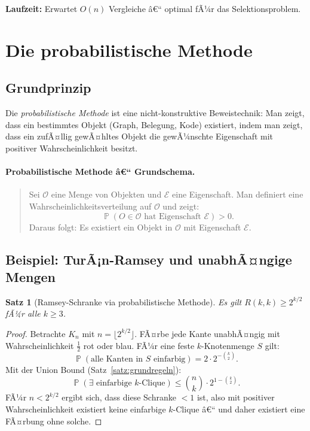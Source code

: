 ﻿\documentclass[12pt,a4paper]{article}
\theoremstyle{definition}
\theoremstyle{plain}
\newtheorem{satz}{Satz}[section]
\theoremstyle{remark}
\DeclareMathOperator{\Prob}{\mathbb{P}}
\begin{document}
\textbf{Laufzeit:} Erwartet $O(n)$ Vergleiche â€“ optimal fÃ¼r das Selektionsproblem.

\section{Die probabilistische Methode}
\label{sec:probmethode}

\subsection{Grundprinzip}

Die \emph{probabilistische Methode} \cite{alon2016probabilistic} ist eine
nicht-konstruktive Beweistechnik: Man zeigt, dass ein bestimmtes Objekt
(Graph, Belegung, Kode) existiert, indem man zeigt, dass ein zufÃ¤llig
gewÃ¤hltes Objekt die gewÃ¼nschte Eigenschaft mit positiver Wahrscheinlichkeit
besitzt.

\paragraph*{Probabilistische Methode â€“ Grundschema.}
\begin{quote}
  Sei $\mathcal{O}$ eine Menge von Objekten und $\mathcal{E}$ eine Eigenschaft.
  Man definiert eine Wahrscheinlichkeitsverteilung auf $\mathcal{O}$ und zeigt:
  \[
    \Prob(O \in \mathcal{O} \text{ hat Eigenschaft } \mathcal{E}) > 0.
  \]
  Daraus folgt: Es existiert ein Objekt in $\mathcal{O}$ mit Eigenschaft $\mathcal{E}$.
\end{quote}

\subsection{Beispiel: TurÃ¡n-Ramsey und unabhÃ¤ngige Mengen}

\begin{satz}[Ramsey-Schranke via probabilistische Methode]\label{satz:ramsey}
  Es gilt $R(k,k) \geq 2^{k/2}$ fÃ¼r alle $k \geq 3$.
\end{satz}

\begin{proof}
  Betrachte $K_n$ mit $n = \lfloor 2^{k/2} \rfloor$. FÃ¤rbe jede Kante
  unabhÃ¤ngig mit Wahrscheinlichkeit $\frac{1}{2}$ rot oder blau. FÃ¼r eine
  feste $k$-Knotenmenge $S$ gilt:
  \[
    \Prob(\text{alle Kanten in }S\text{ einfarbig}) = 2 \cdot 2^{-\binom{k}{2}}.
  \]
  Mit der Union Bound (Satz~\ref{satz:grundregeln}):
  \[
    \Prob(\exists \text{ einfarbige } k\text{-Clique}) \leq \binom{n}{k} \cdot 2^{1-\binom{k}{2}}.
  \]
  FÃ¼r $n < 2^{k/2}$ ergibt sich, dass diese Schranke $< 1$ ist, also mit
  positiver Wahrscheinlichkeit existiert keine einfarbige $k$-Clique â€“
  und daher existiert eine FÃ¤rbung ohne solche.
\end{proof}
\end{document}
